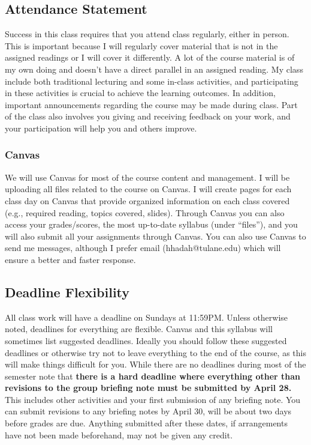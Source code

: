 \documentclass[11pt,letterpaper,final]{article}
\begin{document}
\subsection{Attendance Statement} 
Success in this class requires that you attend class regularly, either in person. This is important because I will regularly cover material that is not in the assigned readings or I will cover it differently. A lot of the course material is of my own doing and doesn't have a direct parallel in an assigned reading. My class include both traditional lecturing and some in-class activities, and participating in these activities is crucial to achieve the learning outcomes. In addition, important announcements regarding the course may be made during class. Part of the class also involves you giving and receiving feedback on your work, and your participation will help you and others improve.

\subsubsection{Canvas}
We will use Canvas for most of the course content and management. I will be uploading all files related to the course on Canvas. I will create pages for each class day on Canvas that provide organized information on each class covered (e.g., required reading, topics covered, slides). Through Canvas you can also access your grades/scores, the most up-to-date syllabus (under ``files''), and you will also submit all your assignments through Canvas. You can also use Canvas to send me messages, although I prefer email (hhadah@tulane.edu) which will ensure a better and faster response.

 
\subsection{Deadline Flexibility}
All class work will have a deadline on Sundays at 11:59PM. Unless otherwise noted, deadlines for everything are flexible. Canvas and this syllabus will sometimes list suggested deadlines. Ideally you should follow these suggested deadlines or otherwise try not to leave everything to the end of the course, as this will make things difficult for you. While there are no deadlines during most of the semester note that \textbf{there is a hard deadline where everything other than revisions to the group briefing note must be submitted by April 28.} This includes other activities and your first submission of any briefing note. You can submit revisions to any briefing notes by April 30, will be about two days before grades are due. Anything submitted after these dates, if arrangements have not been made beforehand, may not be given any credit. 
\end{document}
